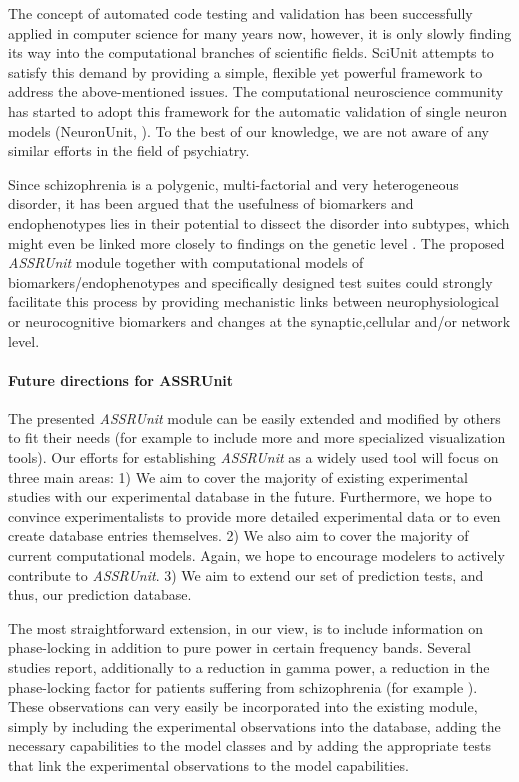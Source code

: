 \documentclass[a4paper,10pt]{article}
\begin{document}
The concept of automated code testing and validation has been successfully applied in computer science for many years now, however, it is only slowly finding its way into the computational 
branches of scientific fields. SciUnit attempts to satisfy this demand by providing a simple, flexible yet powerful framework to address the above-mentioned issues. The computational neuroscience 
community has started to adopt this framework for the automatic validation of single neuron models (NeuronUnit, \cite{Gerkin2014}). 
To the best of our knowledge, we are not aware of any similar efforts in the field of psychiatry.

Since schizophrenia is a polygenic, multi-factorial and very heterogeneous disorder, it has been argued that the usefulness of biomarkers and endophenotypes lies in their potential to
dissect the disorder into subtypes, which might even be linked more closely to findings on the genetic level \cite{Meyer2006,Perlis2011,Markou2009}. The proposed \textit{ASSRUnit} module together with computational models of 
biomarkers/endophenotypes and specifically designed test suites could strongly facilitate this process by providing mechanistic links between neurophysiological or neurocognitive biomarkers
and changes at the synaptic,cellular and/or network level.


\paragraph{Future directions for ASSRUnit}
The presented \textit{ASSRUnit} module can be easily extended and modified by others to fit their needs (for example to include  more and more specialized visualization tools). Our efforts
for establishing \textit{ASSRUnit} as a widely used tool will focus on three main areas: 1) We aim to cover the majority of existing experimental studies with our experimental database in the future.
Furthermore, we hope to convince experimentalists to provide more detailed experimental data or to
even create database entries themselves. 2) We also aim to cover the majority of current computational models. Again, we hope to encourage modelers to actively contribute to \textit{ASSRUnit}.
3) We aim to extend our set of prediction tests, and thus, our prediction database. 

The most straightforward extension, in our view, is to include information on phase-locking in addition to 
pure power in certain frequency bands. 
Several studies report, additionally to a reduction in gamma power, a  reduction in the phase-locking factor for patients suffering from schizophrenia 
(for example \cite{Kwon1999,Brenner2003,Light2006,Vierling2008,Krishnan2009}). These observations can very easily be incorporated into the existing module, simply by including the experimental observations into the database,
adding the necessary capabilities to the model classes and by adding the appropriate tests that link the experimental observations to the model capabilities.
\end{document}
